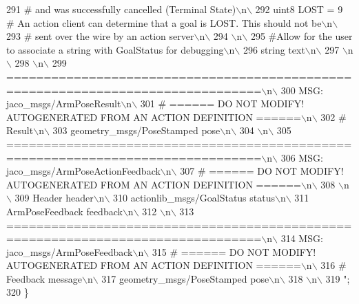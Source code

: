 \begin{DoxyCode}
291 \textcolor{stringliteral}{                            #    and was successfully cancelled (Terminal State)\(\backslash\)n\(\backslash\)}
292 \textcolor{stringliteral}{uint8 LOST            = 9   # An action client can determine that a goal is LOST. This should not be\(\backslash\)n\(\backslash\)}
293 \textcolor{stringliteral}{                            #    sent over the wire by an action server\(\backslash\)n\(\backslash\)}
294 \textcolor{stringliteral}{\(\backslash\)n\(\backslash\)}
295 \textcolor{stringliteral}{#Allow for the user to associate a string with GoalStatus for debugging\(\backslash\)n\(\backslash\)}
296 \textcolor{stringliteral}{string text\(\backslash\)n\(\backslash\)}
297 \textcolor{stringliteral}{\(\backslash\)n\(\backslash\)}
298 \textcolor{stringliteral}{\(\backslash\)n\(\backslash\)}
299 \textcolor{stringliteral}{================================================================================\(\backslash\)n\(\backslash\)}
300 \textcolor{stringliteral}{MSG: jaco\_msgs/ArmPoseResult\(\backslash\)n\(\backslash\)}
301 \textcolor{stringliteral}{# ====== DO NOT MODIFY! AUTOGENERATED FROM AN ACTION DEFINITION ======\(\backslash\)n\(\backslash\)}
302 \textcolor{stringliteral}{# Result\(\backslash\)n\(\backslash\)}
303 \textcolor{stringliteral}{geometry\_msgs/PoseStamped pose\(\backslash\)n\(\backslash\)}
304 \textcolor{stringliteral}{\(\backslash\)n\(\backslash\)}
305 \textcolor{stringliteral}{================================================================================\(\backslash\)n\(\backslash\)}
306 \textcolor{stringliteral}{MSG: jaco\_msgs/ArmPoseActionFeedback\(\backslash\)n\(\backslash\)}
307 \textcolor{stringliteral}{# ====== DO NOT MODIFY! AUTOGENERATED FROM AN ACTION DEFINITION ======\(\backslash\)n\(\backslash\)}
308 \textcolor{stringliteral}{\(\backslash\)n\(\backslash\)}
309 \textcolor{stringliteral}{Header header\(\backslash\)n\(\backslash\)}
310 \textcolor{stringliteral}{actionlib\_msgs/GoalStatus status\(\backslash\)n\(\backslash\)}
311 \textcolor{stringliteral}{ArmPoseFeedback feedback\(\backslash\)n\(\backslash\)}
312 \textcolor{stringliteral}{\(\backslash\)n\(\backslash\)}
313 \textcolor{stringliteral}{================================================================================\(\backslash\)n\(\backslash\)}
314 \textcolor{stringliteral}{MSG: jaco\_msgs/ArmPoseFeedback\(\backslash\)n\(\backslash\)}
315 \textcolor{stringliteral}{# ====== DO NOT MODIFY! AUTOGENERATED FROM AN ACTION DEFINITION ======\(\backslash\)n\(\backslash\)}
316 \textcolor{stringliteral}{# Feedback message\(\backslash\)n\(\backslash\)}
317 \textcolor{stringliteral}{geometry\_msgs/PoseStamped pose\(\backslash\)n\(\backslash\)}
318 \textcolor{stringliteral}{\(\backslash\)n\(\backslash\)}
319 \textcolor{stringliteral}{"};
320   \}
\end{DoxyCode}
